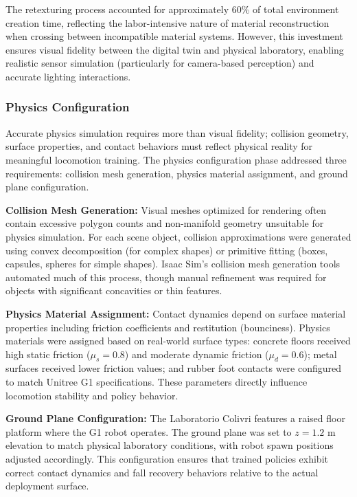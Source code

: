 \documentclass[12pt,a4paper]{article}
\begin{document}
The retexturing process accounted for approximately 60\% of total environment creation time, reflecting the labor-intensive nature of material reconstruction when crossing between incompatible material systems. However, this investment ensures visual fidelity between the digital twin and physical laboratory, enabling realistic sensor simulation (particularly for camera-based perception) and accurate lighting interactions.

\subsubsection{Physics Configuration}

Accurate physics simulation requires more than visual fidelity; collision geometry, surface properties, and contact behaviors must reflect physical reality for meaningful locomotion training. The physics configuration phase addressed three requirements: collision mesh generation, physics material assignment, and ground plane configuration.

\textbf{Collision Mesh Generation:} Visual meshes optimized for rendering often contain excessive polygon counts and non-manifold geometry unsuitable for physics simulation. For each scene object, collision approximations were generated using convex decomposition (for complex shapes) or primitive fitting (boxes, capsules, spheres for simple shapes). Isaac Sim's collision mesh generation tools automated much of this process, though manual refinement was required for objects with significant concavities or thin features.

\textbf{Physics Material Assignment:} Contact dynamics depend on surface material properties including friction coefficients and restitution (bounciness). Physics materials were assigned based on real-world surface types: concrete floors received high static friction ($\mu_s = 0.8$) and moderate dynamic friction ($\mu_d = 0.6$); metal surfaces received lower friction values; and rubber foot contacts were configured to match Unitree G1 specifications. These parameters directly influence locomotion stability and policy behavior.

\textbf{Ground Plane Configuration:} The Laboratorio Colivri features a raised floor platform where the G1 robot operates. The ground plane was set to $z = 1.2$ m elevation to match physical laboratory conditions, with robot spawn positions adjusted accordingly. This configuration ensures that trained policies exhibit correct contact dynamics and fall recovery behaviors relative to the actual deployment surface.
\end{document}
